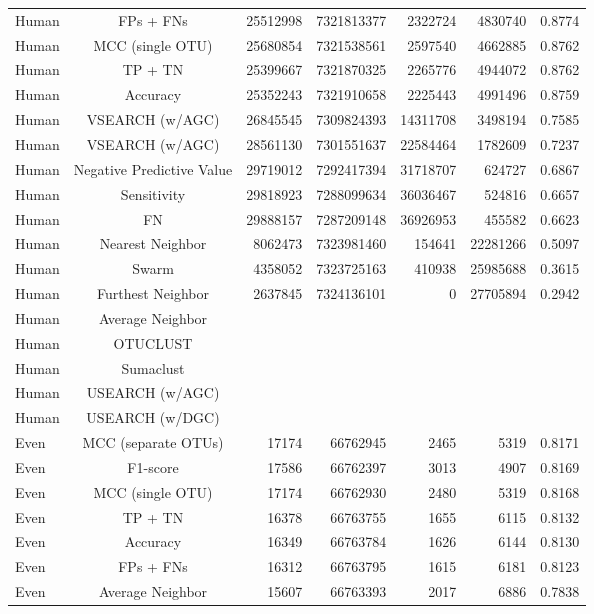 \documentclass[]{article}
\begin{document}
\begin{table}[!ht]
\begin{tabular}{lcrrrrc}
  Human & FPs + FNs & 25512998 & 7321813377 & 2322724 & 4830740 & 0.8774 \\ 
  Human & MCC (single OTU) & 25680854 & 7321538561 & 2597540 & 4662885 & 0.8762 \\ 
  Human & TP + TN & 25399667 & 7321870325 & 2265776 & 4944072 & 0.8762 \\ 
  Human & Accuracy & 25352243 & 7321910658 & 2225443 & 4991496 & 0.8759 \\ 
  Human & VSEARCH (w/AGC) & 26845545 & 7309824393 & 14311708 & 3498194 & 0.7585 \\ 
  Human & VSEARCH (w/AGC) & 28561130 & 7301551637 & 22584464 & 1782609 & 0.7237 \\ 
  Human & Negative Predictive Value & 29719012 & 7292417394 & 31718707 & 624727 & 0.6867 \\ 
  Human & Sensitivity & 29818923 & 7288099634 & 36036467 & 524816 & 0.6657 \\ 
  Human & FN & 29888157 & 7287209148 & 36926953 & 455582 & 0.6623 \\ 
  Human & Nearest Neighbor & 8062473 & 7323981460 & 154641 & 22281266 & 0.5097 \\ 
  Human & Swarm & 4358052 & 7323725163 & 410938 & 25985688 & 0.3615 \\ 
  Human & Furthest Neighbor & 2637845 & 7324136101 & 0 & 27705894 & 0.2942 \\ 
  Human & Average Neighbor &  &  &  &  &  \\ 
  Human & OTUCLUST &  &  &  &  &  \\ 
  Human & Sumaclust &  &  &  &  &  \\ 
  Human & USEARCH (w/AGC) &  &  &  &  &  \\ 
  Human & USEARCH (w/DGC) &  &  &  &  &  \\ 
  Even & MCC (separate OTUs) & 17174 & 66762945 & 2465 & 5319 & 0.8171 \\ 
  Even & F1-score & 17586 & 66762397 & 3013 & 4907 & 0.8169 \\ 
  Even & MCC (single OTU) & 17174 & 66762930 & 2480 & 5319 & 0.8168 \\ 
  Even & TP + TN & 16378 & 66763755 & 1655 & 6115 & 0.8132 \\ 
  Even & Accuracy & 16349 & 66763784 & 1626 & 6144 & 0.8130 \\ 
  Even & FPs + FNs & 16312 & 66763795 & 1615 & 6181 & 0.8123 \\ 
  Even & Average Neighbor & 15607 & 66763393 & 2017 & 6886 & 0.7838 \\ 

\end{tabular}
\end{table}
\end{document}
